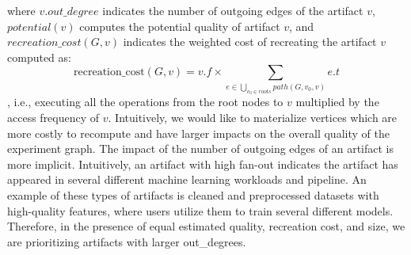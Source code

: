where $v.out\_degree$ indicates the number of outgoing edges of the artifact $v$, $potential(v)$ computes the potential quality of artifact $v$, and $recreation\_cost(G,v)$ indicates the weighted cost of recreating the artifact $v$ computed as:
\[
\text{recreation\_cost}(G,v) = v.f \times \sum\limits_{e \in \bigcup\limits_{v_{0}\in roots} path(G, v_{0}, v)} e.t\]
, i.e., executing all the operations from the root nodes to $v$ multiplied by the access frequency of $v$.
Intuitively, we would like to materialize vertices which are more costly to recompute and have larger impacts on the overall quality of the experiment graph.
The impact of the number of outgoing edges of an artifact is more implicit.
Intuitively, an artifact with high fan-out indicates the artifact has appeared in several different machine learning workloads and pipeline.
An example of these types of artifacts is cleaned and preprocessed datasets with high-quality features, where users utilize them to train several different models.
Therefore, in the presence of equal estimated quality, recreation cost, and size, we are prioritizing artifacts with larger out\_degrees.

%
%
